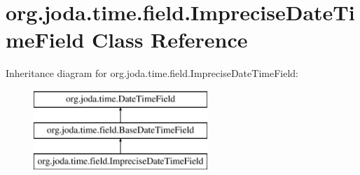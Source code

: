 \hypertarget{classorg_1_1joda_1_1time_1_1field_1_1_imprecise_date_time_field}{\section{org.\-joda.\-time.\-field.\-Imprecise\-Date\-Time\-Field Class Reference}
\label{classorg_1_1joda_1_1time_1_1field_1_1_imprecise_date_time_field}
}
Inheritance diagram for org.\-joda.\-time.\-field.\-Imprecise\-Date\-Time\-Field\-:\begin{figure}[H]
\begin{center}
\leavevmode
\includegraphics[height=3.000000cm]{classorg_1_1joda_1_1time_1_1field_1_1_imprecise_date_time_field}
\end{center}
\end{figure}
